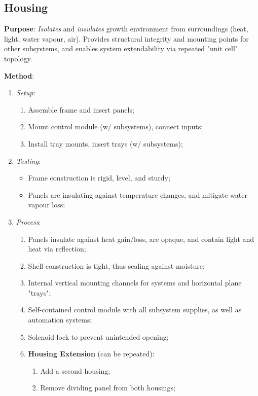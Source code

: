 \subsection{Housing}
\label{sec:housing}

\textbf{Purpose}: \textit{Isolates} and \textit{insulates} growth environment from surroundings (heat, light, water vapour, air). Provides structural integrity and mounting points for other subsystems, and enables system extendability via repeated "unit cell" topology.

\textbf{Method}:
\begin{enumerate}
    \item \textit{Setup}:
    \begin{enumerate}
        \item Assemble frame and insert panels;
        \item Mount control module (w/ subsystems), connect inputs;
        \item Install tray mounts, insert trays (w/ subsystems);
    \end{enumerate}
    \item \textit{Testing}:
    \begin{itemize}
        \item Frame construction is rigid, level, and sturdy;
        \item Panels are insulating against temperature changes, and mitigate water vapour loss;
    \end{itemize}
    \item \textit{Process}:
    \begin{enumerate}
        \item Panels insulate against heat gain/loss, are opaque, and contain light and heat via reflection;
        \item Shell construction is tight, thus sealing against moisture;
        \item Internal vertical mounting channels for systems and horizontal plane "trays";
        \item Self-contained control module with all subsystem supplies, as well as automation systems;
        \item Solenoid lock to prevent unintended opening;
        \item \textbf{Housing Extension} (can be repeated):
        \begin{enumerate}
            \item Add a second housing;
            \item Remove dividing panel from both housings;

\end{enumerate}
\end{enumerate}
\end{enumerate}
